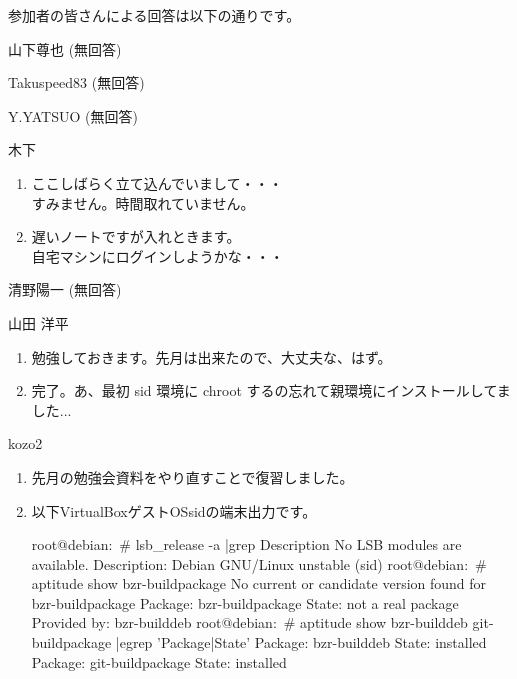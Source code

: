 \documentclass[mingoth,a4paper]{jsarticle}
\begin{document}
参加者の皆さんによる回答は以下の通りです。


\begin{prework}{ 山下尊也 }
(無回答)
\end{prework}

\begin{prework}{ Takuspeed83 }
(無回答)
\end{prework}

\begin{prework}{ Y.YATSUO }
(無回答)
\end{prework}

\begin{prework}{ 木下 }
\begin{enumerate}
\item ここしばらく立て込んでいまして・・・\\
すみません。時間取れていません。
\item 遅いノートですが入れときます。\\
自宅マシンにログインしようかな・・・
\end{enumerate}
\end{prework}

\begin{prework}{  清野陽一 }
(無回答)
\end{prework}

\begin{prework}{ 山田 洋平 }
\begin{enumerate}
\item 勉強しておきます。先月は出来たので、大丈夫な、はず。
\item 完了。あ、最初 sid 環境に chroot するの忘れて親環境にインストールしてました...
\end{enumerate}
\end{prework}

\begin{prework}{ kozo2 }
\begin{enumerate}
\item 先月の勉強会資料をやり直すことで復習しました。
\item 以下VirtualBoxゲストOSsidの端末出力です。
\begin{commandline}
root@debian:~# lsb_release -a |grep Description
No LSB modules are available.
Description:	Debian GNU/Linux unstable (sid)
root@debian:~# aptitude show bzr-buildpackage
No current or candidate version found for bzr-buildpackage
Package: bzr-buildpackage
State: not a real package
Provided by: bzr-builddeb
root@debian:~# aptitude show bzr-builddeb git-buildpackage |egrep 'Package|State'
Package: bzr-builddeb
State: installed
Package: git-buildpackage
State: installed
\end{commandline}
\end{enumerate}
\end{prework}
\end{document}
